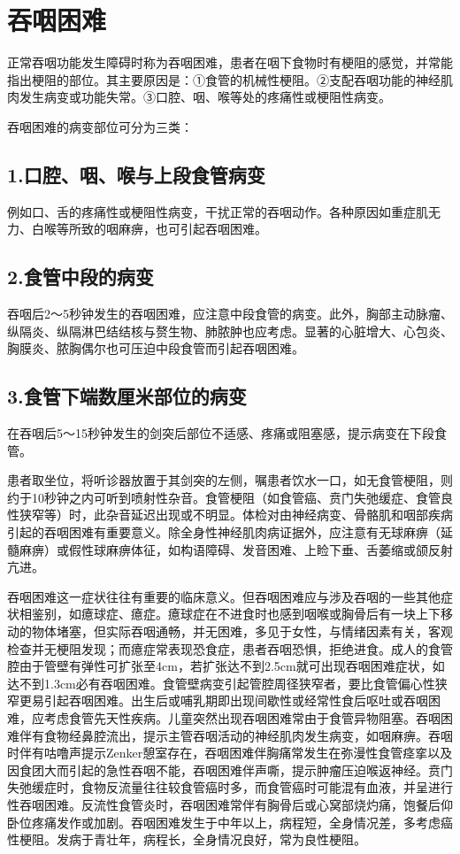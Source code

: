 \chapter{吞咽困难}

正常吞咽功能发生障碍时称为吞咽困难，患者在咽下食物时有梗阻的感觉，并常能指出梗阻的部位。其主要原因是：①食管的机械性梗阻。②支配吞咽功能的神经肌肉发生病变或功能失常。③口腔、咽、喉等处的疼痛性或梗阻性病变。

吞咽困难的病变部位可分为三类：

\section{1.口腔、咽、喉与上段食管病变}

例如口、舌的疼痛性或梗阻性病变，干扰正常的吞咽动作。各种原因如重症肌无力、白喉等所致的咽麻痹，也可引起吞咽困难。

\section{2.食管中段的病变}

吞咽后2～5秒钟发生的吞咽困难，应注意中段食管的病变。此外，胸部主动脉瘤、纵隔炎、纵隔淋巴结结核与赘生物、肺脓肿也应考虑。显著的心脏增大、心包炎、胸膜炎、脓胸偶尔也可压迫中段食管而引起吞咽困难。

\section{3.食管下端数厘米部位的病变}

在吞咽后5～15秒钟发生的剑突后部位不适感、疼痛或阻塞感，提示病变在下段食管。

患者取坐位，将听诊器放置于其剑突的左侧，嘱患者饮水一口，如无食管梗阻，则约于10秒钟之内可听到喷射性杂音。食管梗阻（如食管癌、贲门失弛缓症、食管良性狭窄等）时，此杂音延迟出现或不明显。体检对由神经病变、骨骼肌和咽部疾病引起的吞咽困难有重要意义。除全身性神经肌肉病证据外，应注意有无球麻痹（延髓麻痹）或假性球麻痹体征，如构语障碍、发音困难、上睑下垂、舌萎缩或颌反射亢进。

吞咽困难这一症状往往有重要的临床意义。但吞咽困难应与涉及吞咽的一些其他症状相鉴别，如癔球症、癔症。癔球症在不进食时也感到咽喉或胸骨后有一块上下移动的物体堵塞，但实际吞咽通畅，并无困难，多见于女性，与情绪因素有关，客观检查并无梗阻发现；而癔症常表现恐食症，患者吞咽恐惧，拒绝进食。成人的食管腔由于管壁有弹性可扩张至4cm，若扩张达不到2.5cm就可出现吞咽困难症状，如达不到1.3cm必有吞咽困难。食管壁病变引起管腔周径狭窄者，要比食管偏心性狭窄更易引起吞咽困难。出生后或哺乳期即出现间歇性或经常性食后呕吐或吞咽困难，应考虑食管先天性疾病。儿童突然出现吞咽困难常由于食管异物阻塞。吞咽困难伴有食物经鼻腔流出，提示主管吞咽活动的神经肌肉发生病变，如咽麻痹。吞咽时伴有咕噜声提示Zenker憩室存在，吞咽困难伴胸痛常发生在弥漫性食管痉挛以及因食团大而引起的急性吞咽不能，吞咽困难伴声嘶，提示肿瘤压迫喉返神经。贲门失弛缓症时，食物反流量往往较食管癌时多，而食管癌时可能混有血液，并呈进行性吞咽困难。反流性食管炎时，吞咽困难常伴有胸骨后或心窝部烧灼痛，饱餐后仰卧位疼痛发作或加剧。吞咽困难发生于中年以上，病程短，全身情况差，多考虑癌性梗阻。发病于青壮年，病程长，全身情况良好，常为良性梗阻。

